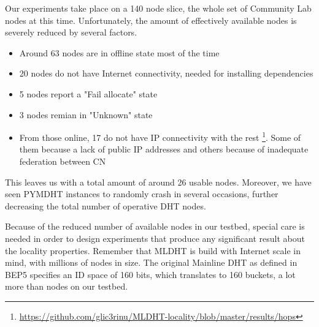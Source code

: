 \documentclass[conference]{IEEEtran}
\begin{document}
Our experiments take place on a 140 node slice, the whole set of Community Lab nodes at this time. Unfortunately, the amount of effectively available nodes is severely reduced by several factors.
\begin{itemize}
\item Around 63 nodes are in offline state most of the time
\item 20 nodes do not have Internet connectivity, needed for installing
dependencies
\item 5 nodes report a "Fail allocate" state
\item 3 nodes remian in "Unknown" state
\item From those online, 17 do not have IP connectivity with the rest \footnote{\url{https://github.com/glic3rinu/MLDHT-locality/blob/master/results/hops}}. Some of them because a lack of public IP addresses and others because of inadequate federation between CN
\end{itemize}

This leaves us with a total amount of around 26 usable nodes. Moreover, we have seen PYMDHT instances to randomly crash in several occasions, further decreasing the total number of operative DHT nodes.

Because of the reduced number of available nodes in our testbed, special care is needed in order to design experiments that produce any significant result about the locality properties. Remember that MLDHT is build with Internet scale in mind, with millions of nodes in size. The original Mainline DHT as defined in BEP5 specifies an ID space of 160 bits, which translates to 160 buckets, a lot more than nodes on our testbed.
\end{document}
